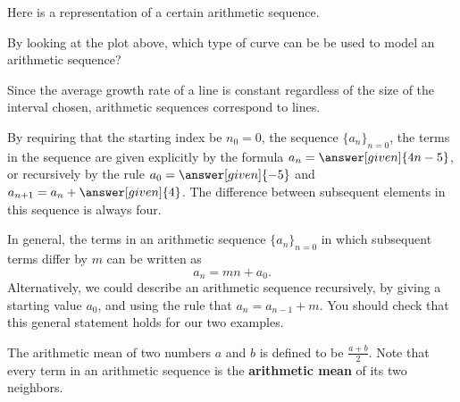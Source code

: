 \documentclass{ximera}
\begin{document}
\begin{example}
  Here is a representation of a certain arithmetic sequence.
  \begin{image}
  \end{image}
  
 \begin{question}
 By looking at the plot above, which type of curve can be be used to model an arithmetic sequence?

  \begin{feedback}
    Since the average growth rate of a line is constant regardless of
    the size of the interval chosen, arithmetic sequences correspond to
    lines.
  \end{feedback}
\end{question}


  By requiring that the starting index be $n_0=0$, the sequence $\{a_n\}_{n=0}$, the terms in the sequence are given explicitly by the formula $a_n=\answer[given]{4n-5}$,
  or recursively by the rule $a_0 = \answer[given]{-5}$ and $a_{n+1} = a_n
  + \answer[given]{4}$. The difference between subsequent elements in this sequence is always four.
\end{example}

In general, the terms in an arithmetic sequence $\{a_n\}_{n=0}$ in which subsequent terms differ
by $m$ can be written as
\[
a_n = m n + a_0.
\]
Alternatively, we could describe an arithmetic sequence recursively,
by giving a starting value $a_0$, and using the rule that $a_{n} =
a_{n-1} + m$.  You should check that this general statement holds for our 
two examples.


\begin{remark}
The arithmetic mean of two numbers $a$ and $b$ is defined to be $\frac{a+b}{2}$. Note that every term in an arithmetic sequence is the \textbf{arithmetic mean} of its two neighbors.  
\end{remark}
\end{document}
